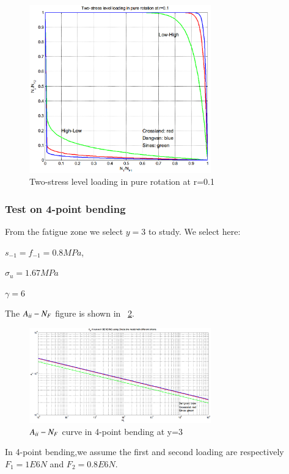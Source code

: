 \documentclass[3p,times,procedia,number]{elsarticle}
\newcommand{\figref}[1]{\figurename~\ref{#1}}
\begin{document}
\begin{figure}[h!]
	\centering
	\includegraphics[width=0.7\textwidth]{figures//2stressR.png} 
	\caption{Two-stress level loading in pure rotation at r=0.1}
	\label{2stressR}
\end{figure}

\newpage
\subsubsection{Test on 4-point bending}
From the fatigue zone we select $y=3$ to study. We select here:

$s_{-1}=f_{-1}=0.8MPa$,

$\sigma_{u}=1.67MPa$ 

$\gamma=6$

The $A_{\uppercase\expandafter{\romannumeral2}}-N_F$ figure is shown in \figref{JNbending}.
\begin{figure}[h!]
	\centering
	\includegraphics[width=0.7\textwidth]{figures//JNbending.png} 
	\caption{$A_{\uppercase\expandafter{\romannumeral2}}-N_F$ curve in 4-point bending at y=3}
	\label{JNbending}
\end{figure}

In 4-point bending,we assume the first and second loading are respectively $F_1=1E6 N$ and $F_2=0.8E6 N$. 
\end{document}
